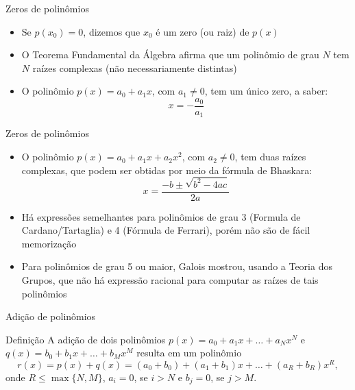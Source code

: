 \begin{frame}[fragile]{Zeros de polinômios}

    \begin{itemize}
        \item Se $p(x_0) = 0$, dizemos que $x_0$ é um zero (ou raiz) de $p(x)$

        \item O Teorema Fundamental da Álgebra afirma que um polinômio de grau $N$ tem $N$ raízes complexas (não necessariamente distintas)

        \item O polinômio $p(x) = a_0 + a_1x$, com $a_1\neq 0$, tem um único zero, a saber:
$$
    x = - \frac{a_0}{a_1}
$$
    \end{itemize}

\end{frame}

\begin{frame}[fragile]{Zeros de polinômios}

    \begin{itemize}
        \item O polinômio $p(x) = a_0 + a_1x + a_2x^2$, com $a_2\neq 0$, tem duas raízes complexas, que podem ser obtidas por meio da fórmula de Bhaskara:
$$
    x = \frac{-b \pm \sqrt{b^2 - 4ac}}{2a}
$$

        \item Há expressões semelhantes para polinômios de grau 3 (Formula de Cardano/Tartaglia) e 4 (Fórmula de Ferrari), porém não são de fácil memorização

        \item Para polinômios de grau 5 ou maior, Galois mostrou, usando a Teoria dos Grupos, que não há expressão racional para computar as raízes de tais
            polinômios
    \end{itemize}

\end{frame}

\begin{frame}[fragile]{Adição de polinômios}

    \begin{block}{Definição}
    A adição de dois polinômios $p(x) = a_0 + a_1x + \ldots + a_Nx^N$ e $q(x) = b_0 + b_1x + \ldots + b_Mx^M$ resulta em um polinômio
    $$
    r(x) = p(x) + q(x) = (a_0 + b_0) + (a_1 + b_1)x + \ldots + (a_R + b_R)x^R,
    $$
    onde $R \leq \max\{N, M\}$, $a_i = 0$, se $i > N$ e $b_j = 0$, se $j > M$.
    \end{block}

\end{frame}

